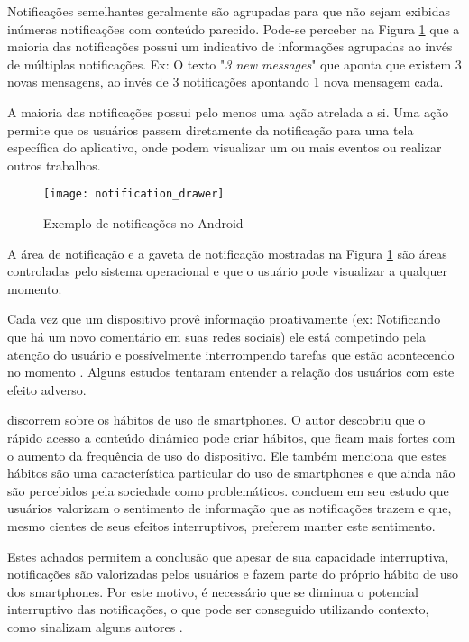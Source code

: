 Notificações semelhantes geralmente são agrupadas para que não sejam exibidas inúmeras notificações com conteúdo parecido.
Pode-se perceber na Figura \ref{notification-drawer} que a maioria das notificações possui um indicativo de informações agrupadas
ao invés de múltiplas notificações. Ex: O texto "\textit{3 new messages}" que aponta que existem 3 novas mensagens, ao invés de 3
notificações apontando 1 nova mensagem cada.

A maioria das notificações possui pelo menos uma ação atrelada a si. Uma ação permite que os usuários passem
diretamente da notificação para uma tela específica do aplicativo, onde podem visualizar um ou mais eventos ou realizar
outros trabalhos.

\begin{figure}[h]
\centering
\texttt{[image: notification\_drawer]}
\caption{Exemplo de notificações no Android \cite{notificationDrawer}}
\label{notification-drawer}
\end{figure}

A área de notificação e a gaveta de notificação mostradas na Figura \ref{notification-drawer} são áreas controladas pelo
sistema operacional e que o usuário pode visualizar a qualquer momento.

Cada vez que um dispositivo provê informação proativamente (ex: Notificando que há um novo comentário em suas redes
sociais) ele está competindo pela atenção do usuário e possívelmente interrompendo tarefas que estão acontecendo no momento
\cite{ho2005using}. Alguns estudos tentaram entender a relação dos usuários com este efeito adverso.

 discorrem sobre os hábitos de uso de smartphones. O autor descobriu que o rápido acesso a
conteúdo dinâmico pode criar hábitos, que ficam mais fortes com o aumento da frequência de uso do dispositivo. Ele
também menciona que estes hábitos são uma característica particular do uso de smartphones e que ainda não são percebidos
pela sociedade como problemáticos.  concluem em seu estudo que usuários valorizam o sentimento
de informação que as notificações trazem e que, mesmo cientes de seus efeitos interruptivos, preferem manter este sentimento.

Estes achados permitem a conclusão que apesar de sua capacidade interruptiva, notificações são valorizadas pelos
usuários e fazem parte do próprio hábito de uso dos smartphones. Por este motivo, é necessário que se diminua o potencial
interruptivo das notificações, o que pode ser conseguido utilizando contexto, como sinalizam alguns autores
\cite{ho2005using, kern2003context, iqbal2010notifications}.

